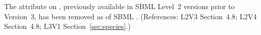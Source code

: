 The  attribute on \Species, previously available in
SBML Level~2 versions prior to Version~3, has been removed as of SBML
\thisLV.  (References: L2V3 Section~4.8; L2V4 Section~4.8; L3V1 Section~\ref{sec:species}.)
